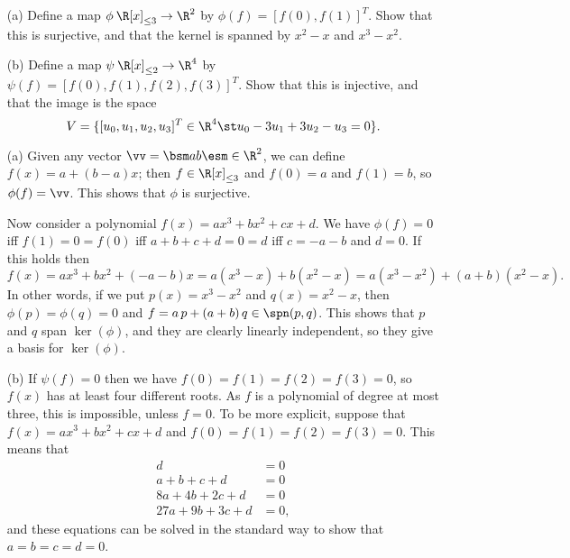 \begin{exercise}\label{ex-surj-misc-ii}
 \begin{itemize}
  \item[(a)] Define a map $\phi\:\R[x]_{\leq 3}\to\R^2$ by
  $\phi(f)=[f(0),f(1)]^T$.  Show that this is surjective, and that
  the kernel is spanned by $x^2-x$ and $x^3-x^2$.
  \item[(b)] Define a map $\psi\:\R[x]_{\leq 2}\to\R^4$ by
  $\psi(f)=[f(0),f(1),f(2),f(3)]^T$.  Show that this is injective,
  and that the image is the space
  \[ V = \{[u_0,u_1,u_2,u_3]^T\in\R^4\st u_0-3u_1+3u_2-u_3=0\}. \]
 \end{itemize}
\end{exercise}
\begin{solution}
 \begin{itemize}
  \item[(a)] Given any vector $\vv=\bsm a\\ b\esm\in\R^2$,
   we can define $f(x)=a+(b-a)x$; then $f\in\R[x]_{\leq 3}$
   and $f(0)=a$ and $f(1)=b$, so $\phi(f)=\vv$.  This shows
   that $\phi$ is surjective.

   Now consider a polynomial $f(x)=ax^3+bx^2+cx+d$.
   We have $\phi(f)=0$ iff $f(1)=0=f(0)$ iff $a+b+c+d=0=d$
   iff $c=-a-b$ and $d=0$.  If this holds then 
   \[ f(x) = ax^3 + bx^2 + (-a-b)x = a(x^3-x) + b(x^2-x) 
       = a(x^3-x^2) + (a+b)(x^2-x).
   \]
   In other words, if we put $p(x)=x^3-x^2$ and
   $q(x)=x^2-x$, then $\phi(p)=\phi(q)=0$ and
   $f=a\,p+(a+b)\,q\in\spn(p,q)$.  This shows that $p$ and
   $q$ span $\ker(\phi)$, and they are clearly linearly
   independent, so they give a basis for $\ker(\phi)$.
  \item[(b)] If $\psi(f)=0$ then we have
   $f(0)=f(1)=f(2)=f(3)=0$, so $f(x)$ has at least four
   different roots.  As $f$ is a polynomial of degree at
   most three, this is impossible, unless $f=0$.  To be more
   explicit, suppose that $f(x)=ax^3+bx^2+cx+d$ and
   $f(0)=f(1)=f(2)=f(3)=0$.  This means that
   \begin{align*}
    d &= 0 \\
    a+b+c+d &= 0 \\
    8a+4b+2c+d &= 0 \\
    27a+9b+3c+d &= 0,
   \end{align*}
   and these equations can be solved in the standard way to
   show that $a=b=c=d=0$.
 \end{itemize}
\end{solution}

